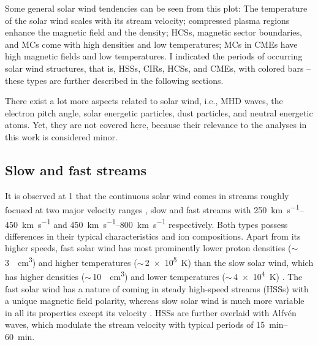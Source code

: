 Some general solar wind tendencies can be seen from this plot: The temperature of the solar wind scales with its stream velocity; compressed plasma regions enhance the magnetic field and the density; HCSs, magnetic sector boundaries, and MCs come with high densities and low temperatures; MCs in CMEs have high magnetic fields and low temperatures. I indicated the periods of occurring solar wind structures, that is, HSSs, CIRs, HCSs, and CMEs, with colored bars -- these types are further described in the following sections.

There exist a lot more aspects related to solar wind, i.e., MHD waves, the electron pitch angle, solar energetic particles, dust particles, and neutral energetic atoms. Yet, they are not covered here, because their relevance to the analyses in this work is considered minor.


\subsection{Slow and fast streams}
\label{sec:slow_and_fast_streams}
It is observed at \SI{1}{\au} that the continuous solar wind comes in streams roughly focused at two major velocity ranges \citep{Neugebauer1966,Schwenn1983}, slow and fast streams with \SIrange{250}{450}{\km\per\s} and \SIrange{450}{800}{\km\per\s} respectively. Both types possess differences in their typical characteristics and ion compositions. Apart from its higher speeds, fast solar wind has most prominently lower proton densities ($\sim$\,\SI{3}{\per\cm\cubed}) and higher temperatures ($\sim$\,\SI{2e5}{\K}) than the slow solar wind, which has higher densities ($\sim$\,\SI{10}{\per\cm\cubed}) and lower temperatures ($\sim$\,\SI{4e4}{\K}) \citep{Schwenn1990}. The fast solar wind has a nature of coming in steady high-speed streams (HSSs) with a unique magnetic field polarity, whereas slow solar wind is much more variable in all its properties except its velocity \citep{Bame1977}. HSSs are further overlaid with Alfvén waves, which modulate the stream velocity with typical periods of \SIrange{15}{60}{\minute}.


